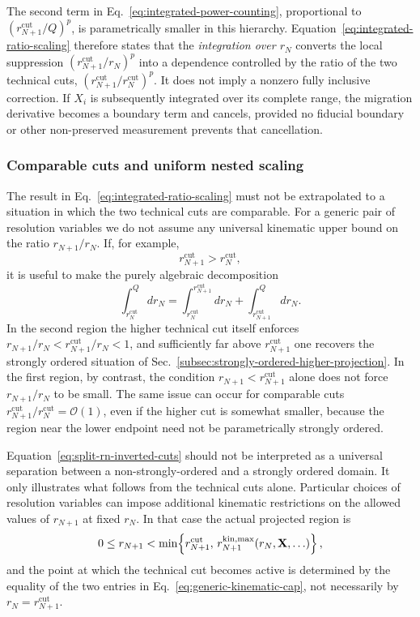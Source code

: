 \documentclass[11pt]{article}
\newcommand{\rn}{r_N}
\newcommand{\rnp}{r_{N+1}}
\newcommand{\cut}{\mathrm{cut}}
\begin{document}
The second term in Eq.~\eqref{eq:integrated-power-counting}, proportional to
\((\rnp^{\cut}/Q)^p\), is parametrically smaller in this hierarchy. Equation~\eqref{eq:integrated-ratio-scaling}
therefore states that the \emph{integration over \(\rn\)} converts the local suppression
\((\rnp^{\cut}/\rn)^p\) into a dependence controlled by the ratio of the two technical cuts,
\((\rnp^{\cut}/\rn^{\cut})^p\). It does not imply a nonzero fully inclusive correction. If \(X_i\) is
subsequently integrated over its complete range, the migration derivative becomes a boundary term and
cancels, provided no fiducial boundary or other non-preserved measurement prevents that cancellation.

\subsubsection{Comparable cuts and uniform nested scaling}

The result in Eq.~\eqref{eq:integrated-ratio-scaling} must not be extrapolated to a situation in which the
two technical cuts are comparable. For a generic pair of resolution variables we do not assume any universal
kinematic upper bound on the ratio \(\rnp/\rn\). If, for example,
\begin{equation}
\rnp^{\cut}>\rn^{\cut},
\label{eq:inverted-cuts}
\end{equation}
it is useful to make the purely algebraic decomposition
\begin{equation}
\int_{\rn^{\cut}}^Q d\rn
=
\int_{\rn^{\cut}}^{\rnp^{\cut}}d\rn
+
\int_{\rnp^{\cut}}^Qd\rn.
\label{eq:split-rn-inverted-cuts}
\end{equation}
In the second region the higher technical cut itself enforces
\(\rnp/\rn<\rnp^{\cut}/\rn<1\), and sufficiently far above
\(\rnp^{\cut}\) one recovers the strongly ordered situation of
Sec.~\ref{subsec:strongly-ordered-higher-projection}. In the first region, by contrast, the condition
\(\rnp<\rnp^{\cut}\) alone does not force \(\rnp/\rn\) to be small. The same issue can occur for comparable
cuts \(\rnp^{\cut}/\rn^{\cut}=\mathcal O(1)\), even if the higher cut is somewhat smaller, because the region
near the lower endpoint need not be parametrically strongly ordered.

Equation~\eqref{eq:split-rn-inverted-cuts} should not be interpreted as a universal separation between a
non-strongly-ordered and a strongly ordered domain. It only illustrates what follows from the technical cuts
alone. Particular choices of resolution variables can impose additional kinematic restrictions on the
allowed values of \(\rnp\) at fixed \(\rn\). In that case the actual projected region is
\begin{equation}
0\le \rnp <
\min\!\left\{
\rnp^{\cut},\,\rnp^{\rm kin,max}(\rn,\mathbf X,\ldots)
\right\},
\label{eq:generic-kinematic-cap}
\end{equation}
and the point at which the technical cut becomes active is determined by the equality of the two entries in
Eq.~\eqref{eq:generic-kinematic-cap}, not necessarily by \(\rn=\rnp^{\cut}\).
\end{document}
